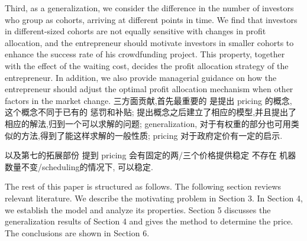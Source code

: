 Third, as a generalization, we consider the difference in the number of investors who group as cohorts, arriving at different points in time. We find that investors in different-sized cohorts are not equally sensitive with changes in profit allocation, and the entrepreneur should motivate investors in smaller cohorts to enhance the success rate of his crowdfunding project. This property, together with the effect of the waiting cost, decides the profit allocation strategy of the entrepreneur. In addition, we also provide managerial guidance on how the entrepreneur should adjust the optimal profit allocation mechanism when other factors in the market change.
三方面贡献,首先最重要的 是提出 pricing 的概念, 这个概念不同于已有的 惩罚和补贴;
提出概念之后建立了相应的模型,并且提出了相应的解法,归到一个可以求解的问题;
generalization, 对于有权重的部分也可用类似的方法,得到了能这样求解的一般性质;
pricing 对于政府定价有一定的启示.

以及第七的拓展部份 提到 pricing 会有固定的两/三个价格提供稳定  不存在 机器数量不变/scheduling的情况下, 可以稳定.

The rest of this paper is structured as follows. The following section reviews relevant literature. We describe the motivating problem in Section 3. In Section 4, we establish the model and analyze its properties. Section 5 discusses the generalization results of Section 4 and gives the method to determine the price. The conclusions are shown in Section 6.
